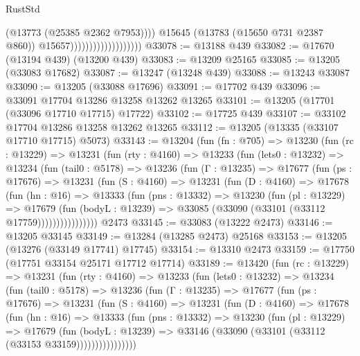\begin{lexlean}{RustStd}
\begin{coremodule}
                                              (@13773 (@25385 @2362 @7953))))
                                          @15645
                                          (@13783 (@15650 @731 @2387 @860))
                                          @15657)))))))))))))))))))
@33078 := @13188 @439
@33082 := @17670 (@13194 @439) (@13200 @439)
@33083 := @13209 @25165
@33085 := @13205 (@33083 @17682)
@33087 := @13247 (@13248 @439)
@33088 := @13243 @33087
@33090 := @13205 (@33088 @17696)
@33091 := @17702 @439
@33096 := @33091 @17704 @13286 @13258 @13262 @13265
@33101 := @13205 (@17701 (@33096 @17710 @17715) @17722)
@33102 := @17725 @439
@33107 := @33102 @17704 @13286 @13258 @13262 @13265
@33112 := @13205 (@13335 (@33107 @17710 @17715) @5073)
@33143 := @13204
    (fun (fn : @705) =>
    @13230
      (fun (rc : @13229) =>
      @13231
        (fun (rty : @4160) =>
        @13233
          (fun (lets0 : @13232) =>
          @13234
            (fun (tail0 : @5178) =>
            @13236
              (fun (Γ : @13235) =>
              @17677
                (fun (ps : @17676) =>
                @13231
                  (fun (S : @4160) =>
                  @13231
                    (fun (D : @4160) =>
                    @17678
                      (fun (hn : @16) =>
                      @13333
                        (fun (pns : @13332) =>
                        @13230
                          (fun (pl : @13229) =>
                          @17679
                            (fun (bodyL : @13239) =>
                            @33085 (@33090 (@33101 (@33112 @17759))))))))))))))))
    @2473
@33145 := @33083 (@13222 @2473)
@33146 := @13205 @33145
@33149 := @13284 (@13285 @2473) @25168
@33153 := @13205 (@13276 (@33149 @17741) @17745)
@33154 := @13310 @2473
@33159 := @17750 (@17751 @33154 @25171 @17712 @17714)
@33189 := @13420
    (fun (rc : @13229) =>
    @13231
      (fun (rty : @4160) =>
      @13233
        (fun (lets0 : @13232) =>
        @13234
          (fun (tail0 : @5178) =>
          @13236
            (fun (Γ : @13235) =>
            @17677
              (fun (ps : @17676) =>
              @13231
                (fun (S : @4160) =>
                @13231
                  (fun (D : @4160) =>
                  @17678
                    (fun (hn : @16) =>
                    @13333
                      (fun (pns : @13332) =>
                      @13230
                        (fun (pl : @13229) =>
                        @17679
                          (fun (bodyL : @13239) =>
                          @33146 (@33090 (@33101 (@33112 (@33153 @33159))))))))))))))))

\end{coremodule}
\end{lexlean}
